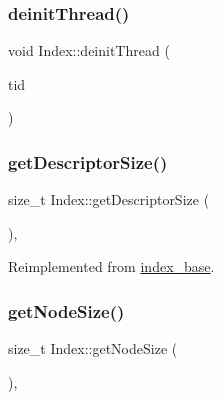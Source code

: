 \mbox{\label{classIndex_a62ecc92aa23b7292ea6735ff9ac21c80}} 
\subsubsection{\texorpdfstring{deinit\+Thread()}{deinitThread()}\hspace{0.1cm}{\footnotesize\ttfamily [2/2]}}
{\footnotesize\ttfamily void Index\+::deinit\+Thread (\begin{DoxyParamCaption}\item[{const int}]{tid }\end{DoxyParamCaption})\hspace{0.3cm}{\ttfamily [inline]}}

\mbox{\label{classIndex_a0e0b37468dc2b549208da43466a68a94}} 
\subsubsection{\texorpdfstring{get\+Descriptor\+Size()}{getDescriptorSize()}}
{\footnotesize\ttfamily size\+\_\+t Index\+::get\+Descriptor\+Size (\begin{DoxyParamCaption}{ }\end{DoxyParamCaption})\hspace{0.3cm}{\ttfamily [inline]}, {\ttfamily [virtual]}}



Reimplemented from \hyperlink{classindex__base_a0050e83a568a2905c54c81d7515f4085}{index\+\_\+base}.

\mbox{\label{classIndex_ad70e606faaf0a67b690275b8f8ca5d5f}} 
\subsubsection{\texorpdfstring{get\+Node\+Size()}{getNodeSize()}}
{\footnotesize\ttfamily size\+\_\+t Index\+::get\+Node\+Size (\begin{DoxyParamCaption}{ }\end{DoxyParamCaption})\hspace{0.3cm}{\ttfamily [inline]}, {\ttfamily [virtual]}}



